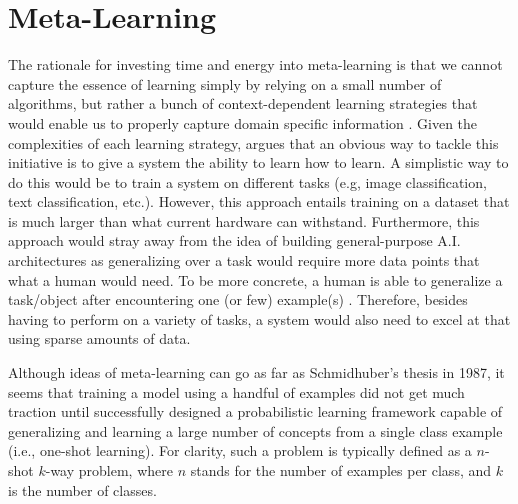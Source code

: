 \documentclass[a4paper]{book}
\begin{document}
\section{Meta-Learning} \label{sec:learn2learn}

The rationale for investing time and energy into meta-learning is that we cannot capture the essence of learning simply by relying on a small number of algorithms, but rather a bunch of context-dependent learning strategies that would enable us to properly capture domain specific information \parencite{schmidhuber_evolutionary_1987}. Given the complexities of each learning strategy, \textcite{schmidhuber_evolutionary_1987} argues that an obvious way to tackle this initiative is to give a system the ability to learn how to learn. A simplistic way to do this would be to train a system on different tasks (e.g, image classification, text classification, etc.). However, this approach entails training on a dataset that is much larger than what current hardware can withstand. Furthermore, this approach would stray away from the idea of building general-purpose A.I. architectures as generalizing over a task would require more data points that what a human would need. To be more concrete, a human is able to generalize a task/object after encountering one (or few) example(s) \parencite{ravi_optimization_2016, chen_closer_2018}. Therefore, besides having to perform on a variety of tasks, a system would also need to excel at that using sparse amounts of data.

Although ideas of meta-learning can go as far as Schmidhuber's thesis in 1987, it seems that training a model using a handful of examples did not get much traction until \textcite{lake_human-level_2015} successfully designed a probabilistic learning framework capable of generalizing and learning a large number of concepts from a single class example (i.e., one-shot learning). For clarity, such a problem is typically defined as a $n$-shot $k$-way problem, where $n$ stands for the number of examples per class, and $k$ is the number of classes.
\end{document}
